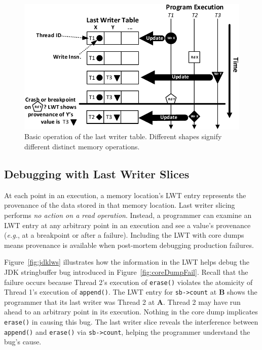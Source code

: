 \documentclass[10pt,nocopyrightspace]{sigplanconf}
\newcommand{\lwt}{LWT\xspace}
\newcommand{\Caption}[1]{\begin{minipage}{.95\columnwidth} \caption{#1} \end{minipage} \vspace{-1.2ex}}
\begin{document}
\begin{figure}[h]
\centering
\includegraphics[scale=.6]{figs/BasicLWT.pdf}
\Caption{\label{fig:basicLWT}Basic operation of the last writer table. Different shapes signify different distinct memory operations. }
\end{figure}


\subsection{Debugging with Last Writer Slices}
\label{sec:debugging}

At each point in an execution, a memory location's \lwt entry represents the
provenance of the data stored in that memory location.   Last writer slicing
performs {\em no action on a read operation}.  Instead, a programmer can
examine an \lwt entry at any arbitrary point in an execution and see a value's
provenance ({\em e.g.}, at a breakpoint or after a failure).  Including the
\lwt with core dumps means provenance is available when post-mortem debugging
production failures.

Figure~\ref{fig:jdklws} illustrates how the information in the \lwt helps debug
the JDK stringbuffer bug introduced in Figure~\ref{fig:coreDumpFail}.  Recall
that the failure occurs because Thread 2's execution of {\tt erase()} violates
the atomicity of Thread 1's execution of {\tt append()}.  The \lwt entry for
{\tt sb->count} at {\bf B} shows the programmer that its last writer was Thread
2 at {\bf A}. Thread 2 may have run ahead to an arbitrary point in its
execution.  Nothing in the core dump implicates {\tt erase()} in causing
this bug.  The last writer slice reveals the interference between {\tt append()}
and {\tt erase()} via {\tt sb->count}, helping the programmer understand the
bug's cause.
\end{document}
